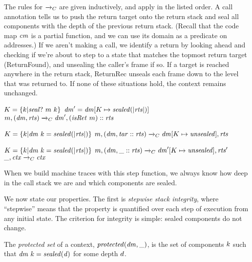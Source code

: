 \documentclass[acmsmall,review,anonymous]{acmart}\settopmatter{printfolios=true,printccs=false,printacmref=false}
\begin{document}
{{The rules for \(\xrightarrow{}_C\) are given inductively, and apply in the listed order.
A call annotation tells us to push the return target onto the return stack and
seal all components with the depth of the previous return stack.
(Recall that the code map \(\mathit{cm}\) is a partial function, and we can use its domain
as a predicate on addresses.) If we aren't making a call,
we identify a return by looking ahead and checking if we're about to step to a state
that matches the topmost return target ({\sc ReturnFound}), and unsealing the caller's frame if so. 
If a target is reached anywhere in the return stack, {\sc ReturnRec}
unseals each frame down to the level that was returned to.
If none of these situations hold, the context remains unchanged.

\judgmentthree[ Call]
              {\(\codemap ~ (\mach ~ \PCname)\)}
              {\(K = \{k | \mathit{seal?} ~ m ~ k\}\)}
              {\(\mathit{dm}' = \mathit{dm}[K \mapsto \mathit{sealed(|\mathit{rts}|)}]\)}
                {\(m,(\mathit{dm},\mathit{rts}) \xrightarrow{}_C \mathit{dm}',(\mathit{isRet} ~ m)::\mathit{rts}\)}

\vspace*{-1ex}
              {\(K = \{k | \mathit{dm} ~ k = \mathit{sealed(|\mathit{rts}|)}\}\)}
              {\(m,(\mathit{dm},\mathit{tar}::\mathit{rts}) \xrightarrow{}_C \mathit{dm}[K \mapsto \mathit{unsealed}],\mathit{rts}\)}

\vspace*{-1ex}
            {\(K = \{k | \mathit{dm} ~ k = \mathit{sealed(|\mathit{rts}|)}\}\)}
            {\(m,(\mathit{dm},\mbox{\_}::\mathit{rts}) \xrightarrow{}_C \mathit{dm}'[K \mapsto \mathit{unsealed}],\mathit{rts}'\)}
\vspace*{-2.5ex}
\judgment[ Default]
         {}
         {\(\mbox{\_},\mathit{ctx} \xrightarrow{}_C \mathit{ctx}\)}

\noindent
When we build machine traces with this step function, we always know how deep in the
call stack we are and which components are sealed.

We now state our properties.
The first is {\em stepwise stack integrity}, where ``stepwise'' means that the property is
quantified over each step of execution from any initial state. The criterion for integrity
is simple: sealed components do not change.

The \emph{protected set} of a context, \(\mathit{protected}(\mathit{dm},\_)\), is the
set of components \(k\) such that \(\mathit{dm} ~ k = \mathit{sealed(d)}\)
for some depth \(d\).

}}
\end{document}
